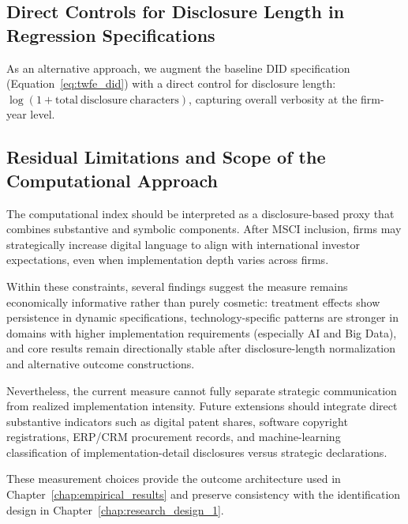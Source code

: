 \subsection{Direct Controls for Disclosure Length in Regression Specifications}

As an alternative approach, we augment the baseline DID specification (Equation~\ref{eq:twfe_did}) with a direct control for disclosure length: $\log(1 + \mathrm{total\ disclosure\ characters})$, capturing overall verbosity at the firm-year level.

\subsection{Residual Limitations and Scope of the Computational Approach}

The computational index should be interpreted as a disclosure-based proxy that combines substantive and symbolic components. After MSCI inclusion, firms may strategically increase digital language to align with international investor expectations, even when implementation depth varies across firms.

Within these constraints, several findings suggest the measure remains economically informative rather than purely cosmetic: treatment effects show persistence in dynamic specifications, technology-specific patterns are stronger in domains with higher implementation requirements (especially AI and Big Data), and core results remain directionally stable after disclosure-length normalization and alternative outcome constructions.

Nevertheless, the current measure cannot fully separate strategic communication from realized implementation intensity. Future extensions should integrate direct substantive indicators such as digital patent shares, software copyright registrations, ERP/CRM procurement records, and machine-learning classification of implementation-detail disclosures versus strategic declarations.

These measurement choices provide the outcome architecture used in Chapter~\ref{chap:empirical_results} and preserve consistency with the identification design in Chapter~\ref{chap:research_design_1}.
